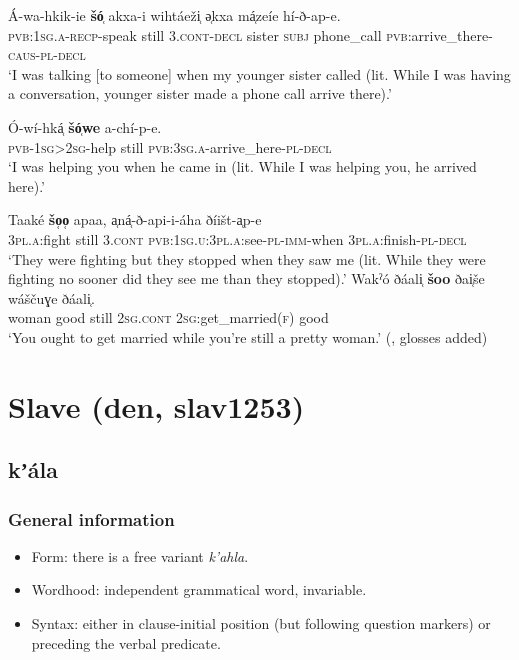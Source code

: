 \begin{exe}
	\ex
	\gll Á-wa-hkik-ie \textbf{šó̜} akxa-i wihtáeži̜ ə̜kxa má̜zeíe hí-ð-ap-e.\\
\textsc{pvb}:1\textsc{sg}.\textsc{a}-\textsc{recp}-speak still 3.\textsc{cont}-\textsc{decl} sister \textsc{subj} phone\_call  \textsc{pvb}:arrive\_there-\textsc{caus}-\textsc{pl}-\textsc{decl}\\
\glt \lq I was talking [to someone] when my younger sister called (lit. While I was having a conversation, younger sister made a phone call arrive there).' \parencite[445]{Quintero2004}

	\ex\label{exAppendixOsageWhen2}
	\gll Ó-wí-hká̜ \textbf{šó̜we} a-chí-p-e.\\
	\textsc{pvb}-1\textsc{sg}>2\textsc{sg}-help still \textsc{pvb}:3\textsc{sg}.\textsc{a}-arrive\_here-\textsc{pl}-\textsc{decl}\\
	\glt \lq I was helping you when he came in (lit. While I was helping you, he arrived here).' \parencite[444]{Quintero2004}

	\ex\label{exAppendixOsageWhen3}
	\gll Taaké \textbf{šo̜o̜} apaa, a̜ná̜-ð-api-i-áha ðíišt-a̜p-e\\
	3\textsc{pl}.\textsc{a}:fight still 3.\textsc{cont} \textsc{pvb}:1\textsc{sg}.\textsc{u}:3\textsc{pl}.\textsc{a}:see-\textsc{pl}-\textsc{imm}-when 3\textsc{pl}.\textsc{a}:finish-\textsc{pl}-\textsc{decl}\\
	\glt \lq They were fighting but they stopped when they saw me (lit. While they
were fighting no sooner did they see me than they stopped).' \parencite[444–445]{Quintero2004}
	\ex\label{exAppendixOsageWhen4}
	\gll Wakˀó ðáali̜ \textbf{šoo} ðai̜še wáščuɣe ðáali̜.\\
woman good still 2\textsc{sg}.\textsc{cont} 2\textsc{sg}:get\_married(\textsc{f}) good\\
	\glt \lq You ought to get married while you're still a pretty woman.\rq{ }(\cite[208]{QuinteroDictionary}, glosses added)
\end{exe}


\section{Slave (den, slav1253)}
\subsection{kʼála}

\subsubsection{General information}
\begin{itemize}
	\item Form: there is a free variant \textit{k'ahla}.
	\item Wordhood: independent grammatical word, invariable.
	\item Syntax: either in clause-initial position (but following question markers) or preceding the verbal predicate.
\end{itemize}


